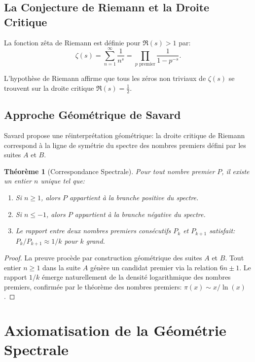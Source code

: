 \documentclass[12pt,a4paper]{article}
\newtheorem{theoreme}{Théorème}
\begin{document}
\subsection{La Conjecture de Riemann et la Droite Critique}

La fonction zêta de Riemann est définie pour $\Re(s) > 1$ par:
\[
  \zeta(s) = \sum_{n=1}^{\infty} \frac{1}{n^s} = \prod_{p \text{ premier}} \frac{1}{1 - p^{-s}}.
\]

L'hypothèse de Riemann affirme que tous les zéros non triviaux de $\zeta(s)$ se
trouvent sur la droite critique $\Re(s) = \frac{1}{2}$.

\subsection{Approche Géométrique de Savard}

Savard propose une réinterprétation géométrique: la droite critique de Riemann
correspond à la ligne de symétrie du spectre des nombres premiers défini par les
suites $A$ et $B$.

\begin{theoreme}[Correspondance Spectrale]
Pour tout nombre premier $P$, il existe un entier $n$ unique tel que:
\begin{enumerate}
  \item Si $n \geq 1$, alors $P$ appartient à la branche positive du spectre.
  \item Si $n \leq -1$, alors $P$ appartient à la branche négative du spectre.
  \item Le rapport entre deux nombres premiers consécutifs $P_k$ et $P_{k+1}$
        satisfait: $P_k / P_{k+1} \approx 1/k$ pour $k$ grand.
\end{enumerate}
\end{theoreme}

\begin{proof}
La preuve procède par construction géométrique des suites $A$ et $B$. Tout entier
$n \geq 1$ dans la suite $A$ génère un candidat premier via la relation $6n \pm 1$.
Le rapport $1/k$ émerge naturellement de la densité logarithmique des nombres premiers,
confirmée par le théorème des nombres premiers: $\pi(x) \sim x/\ln(x)$.
\end{proof}

\section{Axiomatisation de la Géométrie Spectrale}
\end{document}
